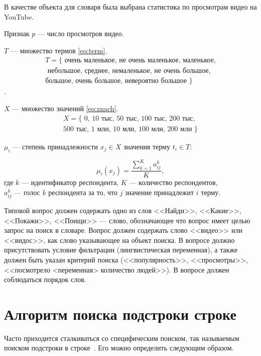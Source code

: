 В качестве объекта для словаря была выбрана статистика по просмотрам видео на YouTube. 

Признак $p$ --- число просмотров видео.

$T$ --- множество термов \eqref{eq:term}.
\begin{equation}
	\label{eq:term}
	\begin{array}{cc}
		T = \{\text{~очень маленькое, не очень маленькое, маленькое,}\\ \text{ небольшое, среднее, немаленькое, не очень большое,}\\ \text{большое, очень большое, невероятно большое~}\}
	\end{array}
\end{equation}.

$X$ --- множество значений \eqref{eq:znach}. 
\begin{equation}
	\label{eq:znach}
	\begin{array}{cc}
		X = \{\text{~0, 10 тыс, 50 тыс, 100 тыс, 200 тыс,} \\ \text{500 тыс, 1 	млн, 10 млн, 100 млн, 200 млн~}\}
	\end{array}
\end{equation}

$\mu_i$ --- степень принадлежности $x_j \in X$ значения терму $t_i \in T$:

\begin{equation}
	\label{eq:mu}
	\mu_i(x_j) = \frac{\sum_{k=1}^{K}a^k_{ij}}{K},
\end{equation}
где $k$ --- идентификатор респондента,
$K$ --- количество респондентов,\\ $a_{ij}^k$ --- голос $k$ респондента за то, что $j$ значение принадлежит $i$ терму.

Типовой вопрос должен содержать одно из слов <<Найди>>, <<Какие>>, <<Покажи>>, <<Поищи>> --- слово, обозначающее что вопрос имеет целью запрос на поиск в словаре. Вопрос должен содержать слово <<видео>> или <<видос>>, как слово указывающее на объект поиска. В вопросе должно присутствовать условие фильтрации (лингвистическая переменная), а также должен быть указан критерий поиска (<<популярность>>, <<просмотры>>, <<посмотрело <переменная> количество людей>>). В вопросе должен соблюдаться порядок слов.

\section{Алгоритм поиска подстроки строке}

Часто приходится сталкиваться со специфическим поиском, так называемым поиском подстроки в строке~\cite{subsearch}. Его можно определить следующим образом. 

